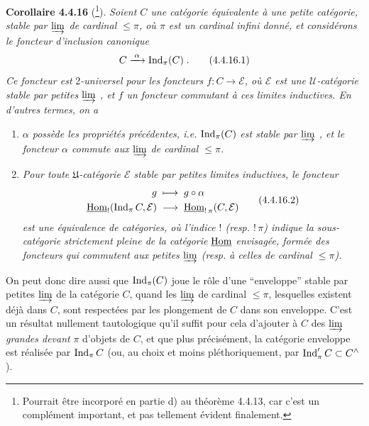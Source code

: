 \textbf{Corollaire 4.4.16} (\footnote{Pourrait être incorporé en partie d) au théorème 4.4.13, car c'est un complément important, et pas tellement évident finalement.}). \textit{Soient $C$ une catégorie équivalente à une petite catégorie, stable par $\varinjlim$ de cardinal $\leqslant\pi$, où $\pi$ est un cardinal infini donné, et considérons le foncteur d'inclusion canonique}
\[
C\xrightarrow{\;\alpha\;}\operatorname{Ind}_\pi(C)\;. \tag*{(4.4.16.1)}
\]
\textit{Ce foncteur est} 2\textit{-universel pour les foncteurs $f:C\longrightarrow\mathcal{E}$, où $\mathcal{E}$ est une $\mathcal{U}$-catégorie stable par petites $\varinjlim$ , et $f$ un foncteur commutant à ces limites inductives. En d'autres termes, on a}
\begin{enumerate}
\item[\textit{1$^\circ$)}] \textit{$\alpha$ possède les propriétés précédentes, i.e.} $\operatorname{Ind}_\pi(C)$ \textit{est stable par $\varinjlim$ , et le foncteur $\alpha$ commute aux $\varinjlim$ de cardinal $\leqslant\pi$.}
\item[\textit{2$^\circ$)}] \textit{Pour toute $\mathfrak{U}$-catégorie $\mathcal{E}$ stable par petites limites inductives, le foncteur}
\[
\begin{aligned}
g\;&\longmapsto\;g\circ\alpha\\
\underline{\mathrm{Hom}}_{!}(\operatorname{Ind}_\pi C,\mathcal{E})\;&\longrightarrow\;\underline{\mathrm{Hom}}_{!\,\pi}(C,\mathcal{E})
\end{aligned}
\tag*{(4.4.16.2)}
\]
\textit{est une équivalence de catégories, où l'indice $!$ (resp. $!\,\pi$) indique la sous-catégorie strictement pleine de la catégorie} $\underline{\mathrm{Hom}}$
\textit{envisagée, formée des foncteurs qui commutent aux petites $\varinjlim$ (resp. à celles de cardinal $\leqslant\pi$).}
\end{enumerate}

On peut donc dire aussi que $\operatorname{Ind}_\pi(C)$ joue le rôle d'une “enveloppe” stable par petites $\varinjlim$ de la catégorie $C$, quand les $\varinjlim$ de cardinal $\leqslant\pi$, lesquelles existent déjà dans $C$, sont respectées par les plongement de $C$ dans son enveloppe. C'est un résultat nullement tautologique qu'il suffit pour cela d'ajouter à $C$ des $\varinjlim$ \textit{grandes devant} $\pi$ d'objets de $C$, et que plus précisément, la catégorie enveloppe est réalisée par $\operatorname{Ind}_\pi C$ (ou, au choix et moins pléthoriquement, par $\operatorname{Ind}'_\pi C\subset C^\wedge$). %

